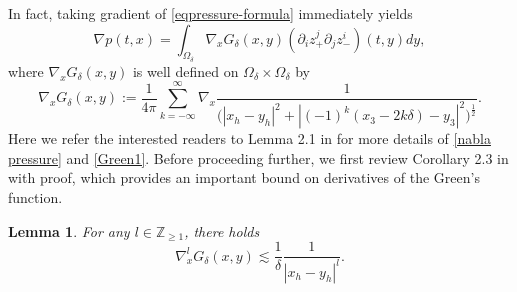 \documentclass[10pt,reqno]{amsart}
\numberwithin{equation}{section}
\newtheorem{lemma}[theorem]{Lemma}
\begin{document}
In fact,
taking gradient of \eqref{eqpressure-formula} immediately yields 
\begin{equation}\label{nabla pressure}
	\nabla p(t,x)=\int_{\Omega_\delta} \nabla_xG_\delta(x,y)(\partial_iz_+^j\partial_jz_-^i)(t,y)dy,
\end{equation}
where
$\nabla_xG_\delta(x,y)$ is well defined on $\Omega_\delta\times\Omega_\delta$ by
\begin{equation}\label{Green1} \nabla_xG_\delta(x,y):=\frac{1}{4\pi}\sum_{k=-\infty}^{\infty}\nabla_x\frac{1}{\big(|x_h-y_h|^2+|(-1)^k(x_3-2k\delta)-y_3|^2\big)^{\frac{1}{2}}}.
\end{equation}
Here we refer the interested readers to Lemma 2.1 in \cite{Xu} for more details of \eqref{nabla pressure} and \eqref{Green1}. 
Before proceeding further, we first review Corollary 2.3 in \cite{Xu} with  proof, which provides an important bound on derivatives of the Green's function.
\begin{lemma}\label{lemma:boundgreen}
	For any $l\in\mathbb{Z}_{\geqslant 1}$, there holds
	\begin{equation}\label{bound of Green}
		\nabla_x^lG_\delta(x,y)\lesssim\frac{1}{\delta}\frac{1}{|x_h-y_h|^l}.
	\end{equation} 

\end{lemma}
\end{document}
